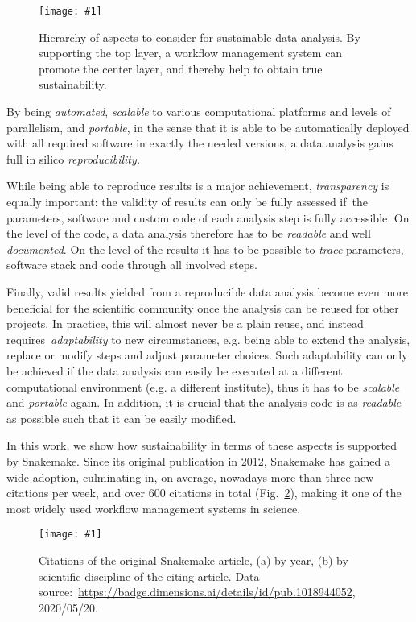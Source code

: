 \documentclass[parskip=half]{scrartcl}
\newcommand{\image}[1]{\centering\texttt{[image: \#1]}}
\let\plainurl\url
\renewcommand{\url}[1]{\protect\plainurl{#1}}
\begin{document}
\begin{figure}
	\image{sustainability-in-wms.pdf}
	\caption{
		Hierarchy of aspects to consider for sustainable data analysis.
		By supporting the top layer, a workflow management system can promote the center layer, and thereby help to obtain true sustainability.
	}\label{fig:sustainability}
\end{figure}

By being \emph{automated}, \emph{scalable} to various computational platforms and levels of parallelism, and \emph{portable}, in the sense that it is able to be automatically deployed with all required software in exactly the needed versions, a data analysis gains full in silico \emph{reproducibility.
}

While being able to reproduce results is a major achievement, \emph{transparency} is equally important: the validity of results can only be fully assessed if~the parameters, software and custom code of each analysis step is fully accessible.
On the level of the code, a data analysis therefore has to be \emph{readable} and well \emph{documented}.
On the level of the results it has to be possible to \emph{trace} parameters, software stack and code through all involved steps.

Finally, valid results yielded from a reproducible data analysis become even more beneficial for the scientific community once the analysis can be reused for other projects.
In practice, this will almost never be a plain reuse, and instead requires~\emph{adaptability} to new circumstances, e.g. being able to extend the analysis, replace or modify steps and adjust parameter choices.
Such adaptability can only be achieved if the data analysis can easily be executed at a different computational environment (e.g. a different institute), thus it has to be \emph{scalable} and \emph{portable} again.
In addition, it is crucial that the analysis code is as \emph{readable} as possible such that it can be easily modified.

In this work, we show how sustainability in terms of these aspects is supported by Snakemake.
Since its original publication in 2012, Snakemake has gained a wide adoption, culminating in, on average, nowadays more than three new citations per week, and over 600 citations in total (Fig.~\ref{fig:citations}), making it one of the most widely used workflow management systems in science.

\begin{figure}
	\image{citations.pdf}
	\caption{
		Citations of the original Snakemake article, (a) by year, (b) by scientific discipline of the citing article.
		Data source:~\url{https://badge.dimensions.ai/details/id/pub.1018944052}, 2020/05/20.
	}
	\label{fig:citations}
\end{figure}
\end{document}
